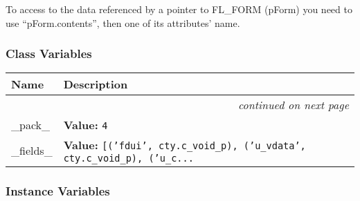 To access to the data referenced by a pointer to FL\_FORM (pForm) you
need to use ``pForm.contents'', then one of its attributes' name.


  \subsubsection{Class Variables}

    \vspace{-1cm}
\hspace{\varindent}\begin{longtable}{|p{\varnamewidth}|p{\vardescrwidth}|l}
\cline{1-2}
\cline{1-2} \centering \textbf{Name} & \centering \textbf{Description}& \\
\cline{1-2}
\endhead\cline{1-2}\multicolumn{3}{r}{\small\textit{continued on next page}}\\\endfoot\cline{1-2}
\endlastfoot\raggedright \_\-p\-a\-c\-k\-\_\- & \raggedright \textbf{Value:} 
{\tt 4}&\\
\cline{1-2}
\raggedright \_\-f\-i\-e\-l\-d\-s\-\_\- & \raggedright \textbf{Value:} 
{\tt [('fdui', cty.c\_void\_p), ('u\_vdata', cty.c\_void\_p), ('u\_c\texttt{...}}&\\
\cline{1-2}
\end{longtable}



  \subsubsection{Instance Variables}

